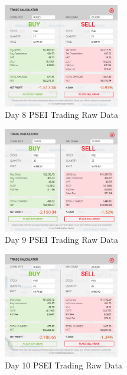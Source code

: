 \begin{figure}[ht]
    \centering
    \includegraphics[width=0.45\textwidth]{./assets/Appendices/B/RawTestsData/PSEI_baseline/day8.png}
    \caption{Day 8 PSEI Trading Raw Data}
    \label{fig:PSEIday8}
\end{figure}
\FloatBarrier

\begin{figure}[ht]
    \centering
    \includegraphics[width=0.45\textwidth]{./assets/Appendices/B/RawTestsData/PSEI_baseline/day9.png}
    \caption{Day 9 PSEI Trading Raw Data}
    \label{fig:PSEIday9}
\end{figure}
\FloatBarrier

\begin{figure}[ht]
    \centering
    \includegraphics[width=0.45\textwidth]{./assets/Appendices/B/RawTestsData/PSEI_baseline/day10.png}
    \caption{Day 10 PSEI Trading Raw Data}
    \label{fig:PSEIday10}
\end{figure}
\FloatBarrier

